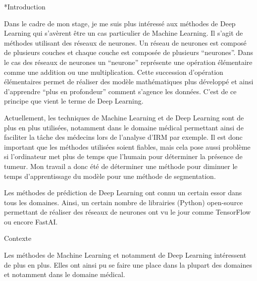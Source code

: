 \documentclass{book}
\newcommand{\p}{\vspace{0.2cm}}
\begin{document}
	\begin{chapter}*{Introduction}


		Dans le cadre de mon stage, je me suis plus intéressé aux méthodes de Deep Learning qui s'avèrent être un cas particulier de Machine Learning. Il s'agit de méthodes utilisant des réseaux de neurones. Un réseau de neurones est composé de plusieurs couches et chaque couche est composée de plusieurs ``neurones''. Dans le cas des réseaux de neurones un ``neurone'' représente une opération élémentaire comme une addition ou une multiplication. Cette succession d'opération élémentaires permet de réaliser des modèle mathématiques plus développé et ainsi d'apprendre ``plus en profondeur'' comment s'agence les données. C'est de ce principe que vient le terme de Deep Learning.\p

		Actuellement, les techniques de Machine Learning et de Deep Learning sont de plus en plus utilisées, notamment dans le domaine médical permettant ainsi de faciliter la tâche des médecins lors de l'analyse d'IRM par exemple. Il est donc important que les méthodes utilisées soient fiables, mais cela pose aussi problème si l'ordinateur met plus de temps que l'humain pour déterminer la présence de tumeur. Mon travail a donc été de déterminer une méthode pour diminuer le temps d'apprentissage du modèle pour une méthode de segmentation.\p

		Les méthodes de prédiction de Deep Learning ont connu un certain essor dans tous les domaines. Ainsi, un certain nombre de librairies (Python) open-source permettant de réaliser des réseaux de neurones ont vu le jour comme TensorFlow ou encore FastAI.\p

	\end{chapter}

	\begin{chapter}{Contexte} %

		Les méthodes de Machine Learning et notamment de Deep Learning intéressent de plus en plus. Elles ont ainsi pu se faire une place dans la plupart des domaines et notamment dans le domaine médical.  

	\end{chapter}
\end{document}
